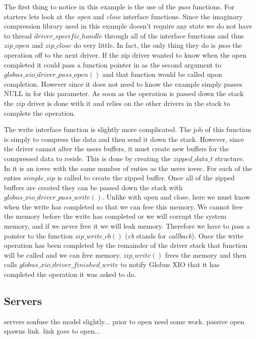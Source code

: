 \documentclass[11pt]{article}
\begin{document}
The first thing to notice in this example is the use of the \emph{pass}
functions.  For starters lets look at the \emph{open} and \emph{close}
interface functions.  Since the imaginary compression library used in this
example doesn't require any state we do not have to thread 
$driver\_specific\_handle$ through all of the interface functions and thus
$zip\_open$ and $zip\_close$ do very little.  In fact, the only thing they
do is \emph{pass} the operation off to the next driver.  If the zip driver
wanted to know when the open completed it could pass a function
pointer in as the second argument to $globus\_xio\_driver\_pass\_open()$ and
that function would be called upon completion.  However since it does
not need to know the example simply passes NULL in for this parameter.
As soon as the operation is passed down the stack the $zip$ driver is 
done with it and relies on the other drivers in the stack to complete
the operation.

The write interface function is slightly more complicated.  The job of
this function is simply to compress the data and then send it down the stack.
However, since the driver cannot alter the users buffers, it must create
new buffers for the compressed data to reside.  This is done by creating
the $zipped\_data\_t$ structure.  In it is an iovec with the same number 
of enties as the users iovec.  For each of the enties $simple\_zip$ is
called to create the zipped buffer.  Once all of the zipped buffers are
created they can be passed down the stack with 
$globus\_xio\_driver\_pass\_write()$.  Unlike with open and close, here we
must know when the write has completed so that we can free this
memory.  We cannot free the memory before the write has completed or
we will corrupt the system memory, and if we never free it we will leak
memory.  Therefore we have to pass a pointer to the function 
$zip\_write\_cb()$ (\emph{cb} stands for \emph{callback}).  Once the
write operation has been completed by the remainder of the driver stack
that function will be called and we can free memory.  $zip\_write()$ frees
the memory and then calls $globus\_xio\_driver\_finished\_write$ to notify
Globus XIO that it has completed the operation it was asked to do.

\subsection{Servers}
servers sonfuse the model slightly... prior to open need some work.  passive
open spawns link.  link goes to open...
\end{document}
